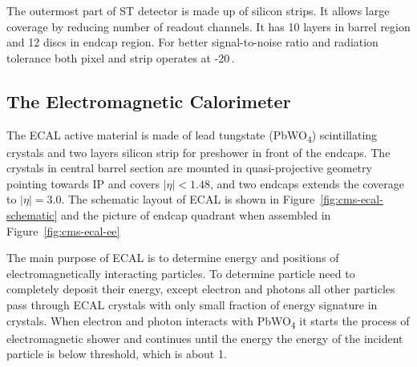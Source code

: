 The outermost part of \gls{ST} detector is made up of silicon strips. It allows large
coverage by reducing number of readout channels. It has 10 layers in barrel region
and 12 discs in endcap region. For better signal-to-noise ratio and radiation
tolerance both pixel and strip operates at -20\,\de{}\xspace.

\subsection{
  The Electromagnetic Calorimeter
}

The \gls{ECAL} active material is made of lead tungstate (PbWO\textsubscript{4})
scintillating crystals and two layers silicon strip for preshower
in front of the endcaps. The crystals in central barrel section are mounted
in quasi-projective geometry pointing towards \gls{IP} and covers
\( |\eta| < 1.48 \), and two endcaps extends the coverage to
\( |\eta| = 3.0 \). The schematic layout of \gls{ECAL} is shown in Figure~\ref{fig:cms-ecal-schematic}
and the picture of endcap quadrant when assembled in Figure~\ref{fig:cms-ecal-ee}

The main purpose of \gls{ECAL} is to determine energy and positions of
electromagnetically interacting particles. To determine particle need to completely
deposit their energy, except electron and photons all other particles pass
through \gls{ECAL} crystals with only small fraction of energy signature in crystals.
When electron and photon interacts with PbWO\textsubscript{4} it starts the process
of electromagnetic shower and continues until the energy the energy of the incident
particle is below threshold, which is about 1\MeV{}.


